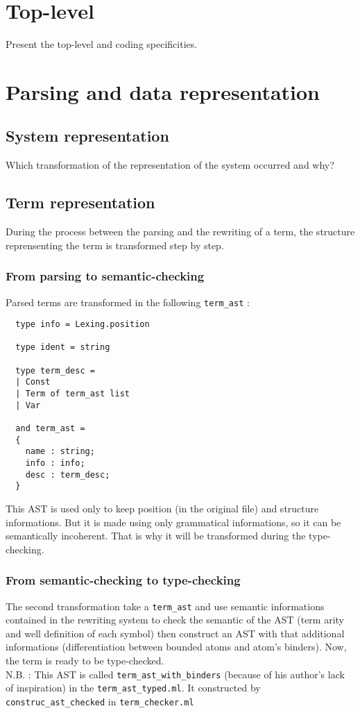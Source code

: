\documentclass[12pt,a4paper]{article}
\begin{document}
\section{Top-level}
Present the top-level and coding specificities.

\section{Parsing and data representation}

\subsection{System representation}
Which transformation of the representation of the system occurred and why?

\subsection{Term representation}
During the process between the parsing and the rewriting of a term, the
structure reprensenting the term is transformed step by step.

\subsubsection{From parsing to semantic-checking}
Parsed terms are transformed in the following \verb?term_ast? :
\begin{lstlisting}
  type info = Lexing.position

  type ident = string

  type term_desc =
  | Const
  | Term of term_ast list
  | Var

  and term_ast =
  {
    name : string;
    info : info;
    desc : term_desc;
  }
\end{lstlisting}

This AST is used only to keep position (in the original file) and structure
informations.
But it is made using only grammatical informations, so it can be
semantically incoherent. That is why it will be transformed during the
type-checking.

\subsubsection{From semantic-checking to type-checking}
The second transformation take a \verb?term_ast? and use semantic informations
contained in the rewriting system to check the semantic of the AST (term
arity and well definition of each symbol)  then
construct an AST with that additional informations (differentiation between
bounded atoms and atom's binders). Now, the term is ready to be type-checked.
\\
N.B. : This AST is called \verb?term_ast_with_binders? (because of his
author's lack of inspiration) in the \verb?term_ast_typed.ml?.
It constructed by \verb?construc_ast_checked? in \verb?term_checker.ml?
\end{document}
